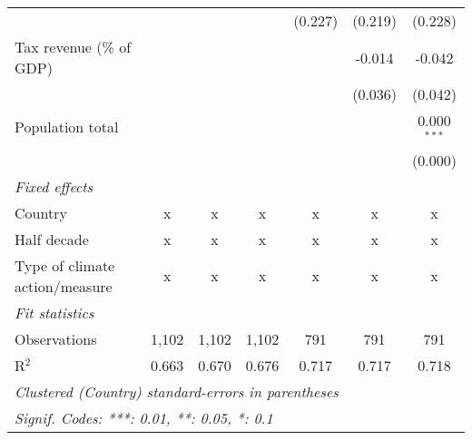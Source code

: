 \begin{tabular}{lcccccc}
                                                  &         &                &                & (0.227)        & (0.219)        & (0.228)\\   
   Tax revenue (\% of GDP)                        &         &                &                &                & -0.014         & -0.042\\   
                                                  &         &                &                &                & (0.036)        & (0.042)\\   
   Population total                               &         &                &                &                &                & 0.000$^{***}$\\   
                                                  &         &                &                &                &                & (0.000)\\   
   \emph{Fixed effects}\\
   Country                                        & x       & x              & x              & x              & x              & x\\  
   Half decade                                    & x       & x              & x              & x              & x              & x\\  
   Type of climate action/measure                 & x       & x              & x              & x              & x              & x\\  
   \midrule \emph{Fit statistics}\\
   Observations                                   & 1,102   & 1,102          & 1,102          & 791            & 791            & 791\\  
   R$^2$                                          & 0.663   & 0.670          & 0.676          & 0.717          & 0.717          & 0.718\\  
   \midrule
   \multicolumn{7}{l}{\emph{Clustered (Country) standard-errors in parentheses}}\\
   \multicolumn{7}{l}{\emph{Signif. Codes: ***: 0.01, **: 0.05, *: 0.1}}\\
\end{tabular}
\par\endgroup


